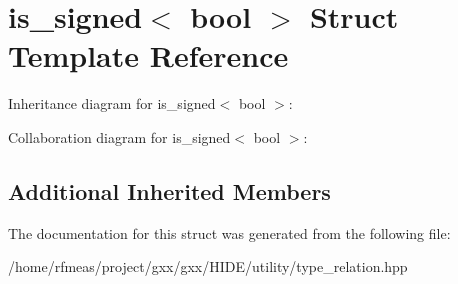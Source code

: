 \hypertarget{structis__signed_3_01bool_01_4}{}\section{is\+\_\+signed$<$ bool $>$ Struct Template Reference}
\label{structis__signed_3_01bool_01_4}


Inheritance diagram for is\+\_\+signed$<$ bool $>$\+:


Collaboration diagram for is\+\_\+signed$<$ bool $>$\+:
\subsection*{Additional Inherited Members}


The documentation for this struct was generated from the following file\+:\begin{DoxyCompactItemize}
\item 
/home/rfmeas/project/gxx/gxx/\+H\+I\+D\+E/utility/type\+\_\+relation.\+hpp\end{DoxyCompactItemize}
